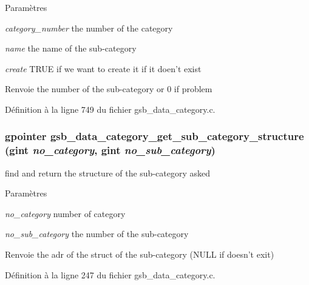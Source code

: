 \begin{DoxyParams}{Paramètres}
\item[{\em category\_\-number}]the number of the category \item[{\em name}]the name of the sub-\/category \item[{\em create}]TRUE if we want to create it if it doen't exist\end{DoxyParams}
\begin{DoxyReturn}{Renvoie}
the number of the sub-\/category or 0 if problem 
\end{DoxyReturn}


Définition à la ligne 749 du fichier gsb\_\-data\_\-category.c.

\subsubsection[{gsb\_\-data\_\-category\_\-get\_\-sub\_\-category\_\-structure}]{\setlength{\rightskip}{0pt plus 5cm}gpointer gsb\_\-data\_\-category\_\-get\_\-sub\_\-category\_\-structure (gint {\em no\_\-category}, \/  gint {\em no\_\-sub\_\-category})}\label{gsb__data__category_8h_ab36a02b615d8b89789810a7f74f338cd}
find and return the structure of the sub-\/category asked


\begin{DoxyParams}{Paramètres}
\item[{\em no\_\-category}]number of category \item[{\em no\_\-sub\_\-category}]the number of the sub-\/category\end{DoxyParams}
\begin{DoxyReturn}{Renvoie}
the adr of the struct of the sub-\/category (NULL if doesn't exit) 
\end{DoxyReturn}


Définition à la ligne 247 du fichier gsb\_\-data\_\-category.c.

